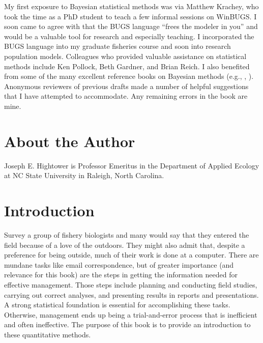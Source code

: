 \documentclass[
]{krantz}
\begin{document}
My first exposure to Bayesian statistical methods was via Matthew Krachey, who took the time as a PhD student to teach a few informal sessions on WinBUGS. I soon came to agree with \citet{kery_2010} that the BUGS language ``frees the modeler in you'' and would be a valuable tool for research and especially teaching. I incorporated the BUGS language into my graduate fisheries course and soon into research population models. Colleagues who provided valuable assistance on statistical methods include Ken Pollock, Beth Gardner, and Brian Reich. I also benefited from some of the many excellent reference books on Bayesian methods (e.g., \citet{mccarthy2007}, \citet{kery_2010} \citet{kery.schaub_2011}).
Anonymous reviewers of previous drafts made a number of helpful suggestions that I have attempted to accommodate. Any remaining errors in the book are mine.

\hypertarget{about-the-author}{%
\chapter*{About the Author}\label{about-the-author}}


Joseph E. Hightower is Professor Emeritus in the Department of Applied Ecology at NC State University in Raleigh, North Carolina.

\mainmatter

\hypertarget{introduction}{%
\chapter{Introduction}\label{introduction}}

Survey a group of fishery biologists and many would say that they entered the field because of a love of the outdoors. They might also admit that, despite a preference for being outside, much of their work is done at a computer. There are mundane tasks like email correspondence, but of greater importance (and relevance for this book) are the steps in getting the information needed for effective management. Those steps include planning and conducting field studies, carrying out correct analyses, and presenting results in reports and presentations. A strong statistical foundation is essential for accomplishing these tasks. Otherwise, management ends up being a trial-and-error process that is inefficient and often ineffective. The purpose of this book is to provide an introduction to these quantitative methods.
\end{document}
